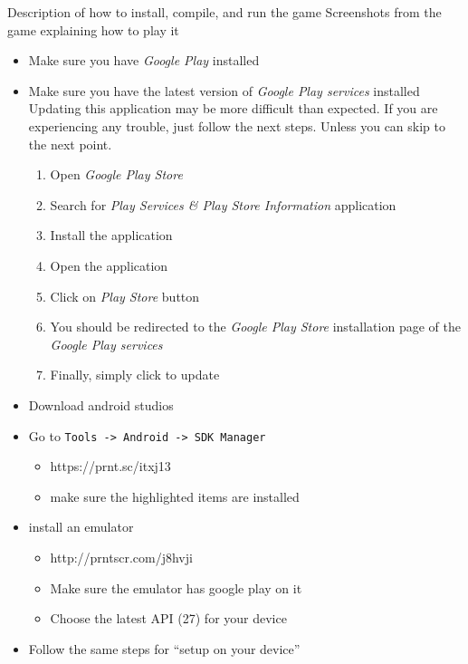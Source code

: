 
Description of how to install, compile, and run the game
Screenshots from the game explaining how to play it


\begin{itemize}
	\item Make sure you have \textit{Google Play} installed
	\item Make sure you have the latest version of \textit{Google Play services} installed \newline
  Updating this application may be more difficult than expected. If you are experiencing any trouble, just follow the next steps. Unless you can skip to the next point.
	\begin{enumerate}
    \item Open \textit{Google Play Store}
    \item Search for \textit{Play Services \& Play Store Information} application
    \item Install the application
    \item Open the application
    \item Click on \textit{Play Store} button
    \item You should be redirected to the \textit{Google Play Store} installation page of the \textit{Google Play services}
    \item Finally, simply click to update
	\end{enumerate}
\end{itemize}

\begin{itemize}
	\item Download android studios %
	\item Go to \texttt{Tools -> Android -> SDK Manager}
	\begin{itemize}
		\item https://prnt.sc/itxj13
		\item make sure the highlighted items are installed
	\end{itemize}
	\item install an emulator
	\begin{itemize}
		\item http://prntscr.com/j8hvji
		\item Make sure the emulator has google play on it
		\item Choose the latest API (27) for your device
  \end{itemize}
  \item Follow the same steps for “setup on your device”
\end{itemize}

